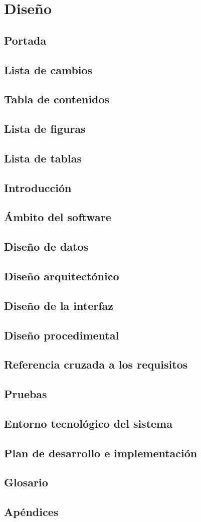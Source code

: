 \chapter{Diseño}

\section{Portada}
\section{Lista de cambios}
\section{Tabla de contenidos}
\section{Lista de figuras}
\section{Lista de tablas}
\section{Introducción}
\section{Ámbito del software}
\section{Diseño de datos}
\section{Diseño arquitectónico}
\section{Diseño de la interfaz}
\section{Diseño procedimental}
\section{Referencia cruzada a los requisitos}
\section{Pruebas}
\section{Entorno tecnológico del sistema}
\section{Plan de desarrollo e implementación}
\section{Glosario}
\section{Apéndices}